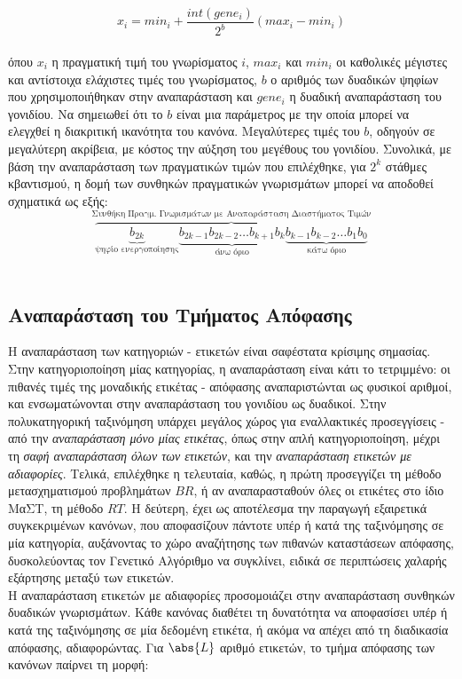 \begin{equation} 
x_{i}=min_{i}+\frac{int(gene_{i})}{2^b}(max_{i} - min_{i}) 
\end{equation}  
\\

όπου $x_{i}$ η πραγματική τιμή του γνωρίσματος $i$, $max_{i}$ και $min_{i}$ οι καθολικές μέγιστες και αντίστοιχα ελάχιστες τιμές του γνωρίσματος, $b$ ο αριθμός των δυαδικών ψηφίων που χρησιμοποιήθηκαν στην αναπαράσταση και $gene_{i}$ η δυαδική αναπαράσταση του γονιδίου. Να σημειωθεί ότι το $b$ είναι μια παράμετρος με την οποία μπορεί να ελεγχθεί η διακριτική ικανότητα του κανόνα. Μεγαλύτερες τιμές του $b$, οδηγούν σε μεγαλύτερη ακρίβεια, με κόστος την αύξηση του μεγέθους του γονιδίου. Συνολικά, με βάση την αναπαράσταση των πραγματικών τιμών που επιλέχθηκε, για $2^{k}$ στάθμες κβαντισμού, η δομή των συνθηκών πραγματικών γνωρισμάτων μπορεί να αποδοθεί σχηματικά ως εξής:
\\

$$ \overbrace{
\underbrace{b_{2k}}_\text{ψηφίο ενεργοποίησης}
\underbrace{b_{2k-1}b_{2k-2}
\dots b_{k+1}b_{k}}_\text{άνω όριο}
\underbrace{b_{k-1}b_{k-2
}\dots b_1b_0}_\text{κάτω όριο}}
^\text{Συνθήκη Πραγμ. Γνωρισμάτων με Αναπαράσταση Διαστήματος Τιμών}$$
\\

\subsection{Αναπαράσταση του Τμήματος Απόφασης}
Η αναπαράσταση των κατηγοριών - ετικετών είναι σαφέστατα κρίσιμης σημασίας. Στην κατηγοριοποίηση μίας κατηγορίας, η αναπαράσταση είναι κάτι το τετριμμένο: οι πιθανές τιμές της μοναδικής ετικέτας - απόφασης αναπαριστώνται ως φυσικοί αριθμοί, και ενσωματώνονται στην αναπαράσταση του γονιδίου ως δυαδικοί. Στην πολυκατηγορική ταξινόμηση υπάρχει μεγάλος χώρος για εναλλακτικές προσεγγίσεις - από την \emph{αναπαράσταση μόνο μίας ετικέτας}, όπως στην απλή κατηγοριοποίηση, μέχρι τη \emph{σαφή αναπαράσταση όλων των ετικετών}, και την \emph{αναπαράσταση ετικετών με αδιαφορίες}. Τελικά, επιλέχθηκε η τελευταία, καθώς, η πρώτη προσεγγίζει τη μέθοδο μετασχηματισμού προβλημάτων $BR$, ή αν αναπαρασταθούν όλες οι ετικέτες στο ίδιο ΜαΣΤ, τη μέθοδο $RT$. Η δεύτερη, έχει ως αποτέλεσμα την παραγωγή εξαιρετικά συγκεκριμένων κανόνων, που αποφασίζουν πάντοτε υπέρ ή κατά της ταξινόμησης σε μία κατηγορία, αυξάνοντας το χώρο αναζήτησης των πιθανών καταστάσεων απόφασης, δυσκολεύοντας τον Γενετικό Αλγόριθμο να συγκλίνει, ειδικά σε περιπτώσεις χαλαρής εξάρτησης μεταξύ των ετικετών. 
\\
Η αναπαράσταση ετικετών με αδιαφορίες προσομοιάζει στην αναπαράσταση συνθηκών δυαδικών γνωρισμάτων. Κάθε κανόνας διαθέτει τη δυνατότητα να αποφασίσει υπέρ ή κατά της ταξινόμησης σε μία δεδομένη ετικέτα, ή ακόμα να απέχει από τη διαδικασία απόφασης, αδιαφορώντας. Για $\abs{L}$ αριθμό ετικετών, το τμήμα απόφασης των κανόνων παίρνει τη μορφή:
\\

